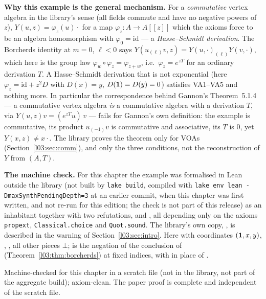 \begin{dictionary}
\textbf{Why this example is the general mechanism.} For a \emph{commutative} vertex algebra in the
library's sense (all fields commute and have no negative powers of $z$), $Y(u,z) = \varphi_z(u)\cdot{}$
for a map $\varphi_z:A\to A[[z]]$ which the axioms force to be an algebra homomorphism with
$\varphi_0 = \mathrm{id}$ --- a \emph{Hasse--Schmidt derivation}. The Borcherds identity at $m=0$,
$\ell<0$ says $Y(u_{(\ell)}v,z) = Y(u,\cdot)_{(\ell)}Y(v,\cdot)$, which here is the group law
$\varphi_w\circ\varphi_z = \varphi_{z+w}$, i.e.\ $\varphi_z = e^{zT}$ for an ordinary derivation $T$. A
Hasse--Schmidt derivation that is not exponential (here $\varphi_z = \mathrm{id}+z^2D$ with $D(x) = y$, $D(\mathbf{1}) = D(y) = 0$)
satisfies VA1--VA5 and nothing more. In particular the correspondence behind Gannon's
Theorem~5.1.4 --- a commutative vertex algebra \emph{is} a commutative algebra with a derivation $T$,
via $Y(u,z)v = (e^{zT}u)\,v$ --- fails for Gannon's own definition: the example is commutative, its
product $u_{(-1)}v$ is commutative and associative, its $T$ is $0$, yet $Y(x,z)\neq x\cdot{}$. The
library proves the theorem only for VOAs (Section~\ref{l03:sec:comm}), and only the three
conditions, not the reconstruction of $Y$ from $(A,T)$.

\textbf{The machine check.} For this chapter the example was formalised in Lean outside the library
(not built by \texttt{lake build}, compiled with
\texttt{lake env lean -DmaxSynthPendingDepth=3} at an earlier commit, when this chapter was first written, and not re-run for
this edition; the check is not part of this release) as an inhabitant
 together with two refutations,  and
, all depending only on the axioms \texttt{propext}, \texttt{Classical.choice} and
\texttt{Quot.sound}. The library's own copy,
, is described in the warning of Section~\ref{l03:sec:intro}.
Here  with coordinates $(\mathbf{1},x,y)$, ,
, all other pieces $\bot$;  is the
negation of the conclusion of  (Theorem~\ref{l03:thm:borcherds})
at fixed indices, with  in place of .
\end{dictionary}

\begin{status}
Machine-checked for this chapter in a scratch file (not in the library, not part of the aggregate
build); axiom-clean. The paper proof is complete and independent of the scratch
file.
\end{status}

